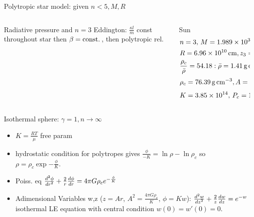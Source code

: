 \begin{frame}{Polytropic star model: given $n<5, M, R$}
\begin{columns}[T]
\begin{column}{0.6\textwidth}
\begin{block}{Radiative pressure and $n=3$}
Eddington: $\frac{\kappa l}{m}$ const throughout star then $\beta=\const{}$, then polytropic rel.
\end{block}
\end{column}
\begin{column}{0.40\textwidth}
    \begin{block}{Sun}
        \begin{align*}
            &n=3,\,M=\SI{1.989e33}{\gram}\\
            &R=\SI{6.96e10}{\cm}, z_3=6.897\\
            &\frac{\rho_c}{\bar{\rho}}=54.18: \bar{\rho}=\SI{1.41}{\gram\per\cubic\cm}\\
            &\rho_c=\SI{76.39}{\gram\per\cubic\cm},A=\frac{z_3}{R}=\num{9.91e-11}\\
            &K=\num{3.85e14},\,P_c=\SI{1.24e17}{\dyn\per\square\cm}
        \end{align*}
    \end{block}
\end{column}
\end{columns}
\end{frame}

\begin{frame}{Isothermal sphere: $\gamma=1, n\to\infty$}
    \begin{itemize}
        \item $K=\frac{RT}{\mu}$ free param
        \item hydrostatic condition for polytropes gives $\frac{\phi}{-K}=\ln{\rho}-\ln{\rho_c}$ so $\rho=\rho_c\exp{-\frac{\phi}{K}}$.
        \item Poiss. eq $\TtwoDy{r}{\phi}+\frac{2}{r}\TDy{r}{\phi}=4\pi G\rho_c\exp{-\frac{\phi}{K}}$
        \item Adimensional Variables w,z ($z=Ar$, $A^2=\frac{4\pi G\rho_c}{K}$, $\phi=Kw$): $\TtwoDy{z}{w}+\frac{2}{z}\TDy{z}{w}=\exp{-w}$ isothermal LE equation with central condition $w(0)=w'(0)=0$.
    \end{itemize}
    \end{frame}

